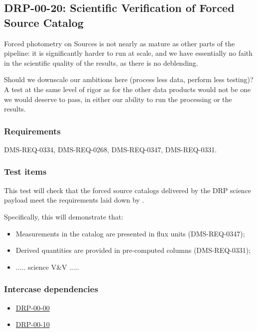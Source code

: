 \subsection{DRP-00-20: Scientific Verification of Forced Source Catalog}
\label{drp-00-20}

\begin{note}
Forced photometry on Sources is not nearly as mature as other parts of the pipeline: it is significantly harder to run at scale, and we have essentially no faith in the scientific quality of the results, as there is no deblending.

Should we downscale our ambitions here (process less data, perform less testing)?  A test at the same level of rigor as for the other data products would not be one we would deserve to pass, in either our ability to run the processing or the results.
\end{note}

\subsubsection{Requirements}

DMS-REQ-0334, DMS-REQ-0268, DMS-REQ-0347, DMS-REQ-0331.

\subsubsection{Test items}
\label{drp-00-20-items}

This test will check that the forced source catalogs delivered by the DRP
science payload meet the requirements laid down by .

Specifically, this will demonstrate that:

\begin{itemize}

  \item{Measurements in the catalog are presented in flux units
  (DMS-REQ-0347);}
  \item{Derived quantities are provided in pre-computed columns
  (DMS-REQ-0331);}
  \item{..... science V\&V .....}

\end{itemize}

\subsubsection{Intercase dependencies}

\begin{itemize}

  \item{\hyperref[drp-00-00]{DRP-00-00}}
  \item{\hyperref[drp-00-10]{DRP-00-10}}

\end{itemize}

